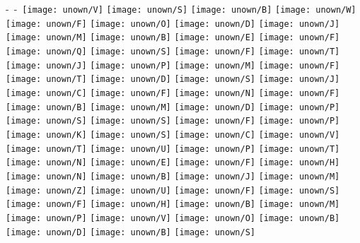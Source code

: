 
\hfill
\vfill

{\noindent -\ -\ 
\texttt{[image: unown/V]}
\texttt{[image: unown/S]}
\texttt{[image: unown/B]}
\texttt{[image: unown/W]}
\texttt{[image: unown/F]}
\texttt{[image: unown/O]}
\texttt{[image: unown/D]}
\texttt{[image: unown/J]}
\texttt{[image: unown/M]}
\texttt{[image: unown/B]}
\texttt{[image: unown/E]}
\texttt{[image: unown/F]}
\texttt{[image: unown/Q]}
\texttt{[image: unown/S]}
\texttt{[image: unown/F]}
\texttt{[image: unown/T]}
\texttt{[image: unown/J]}
\texttt{[image: unown/P]}
\texttt{[image: unown/M]}
\texttt{[image: unown/F]}
\texttt{[image: unown/T]}
\texttt{[image: unown/D]}
\texttt{[image: unown/S]}
\texttt{[image: unown/J]}
\texttt{[image: unown/C]}
\texttt{[image: unown/F]}
\texttt{[image: unown/N]}
\texttt{[image: unown/F]}
\texttt{[image: unown/B]}
\texttt{[image: unown/M]}
\texttt{[image: unown/D]}
\texttt{[image: unown/P]}
\texttt{[image: unown/S]}
\texttt{[image: unown/S]}
\texttt{[image: unown/F]}
\texttt{[image: unown/P]}
\texttt{[image: unown/K]}
\texttt{[image: unown/S]}
\texttt{[image: unown/C]}
\texttt{[image: unown/V]}
\texttt{[image: unown/T]}
\texttt{[image: unown/U]}
\texttt{[image: unown/P]}
\texttt{[image: unown/T]}
\texttt{[image: unown/N]}
\texttt{[image: unown/E]}
\texttt{[image: unown/F]}
\texttt{[image: unown/H]}
\texttt{[image: unown/N]}
\texttt{[image: unown/B]}
\texttt{[image: unown/J]}
\texttt{[image: unown/M]}
\texttt{[image: unown/Z]}
\texttt{[image: unown/U]}
\texttt{[image: unown/F]}
\texttt{[image: unown/S]}
\texttt{[image: unown/F]}
\texttt{[image: unown/H]}
\texttt{[image: unown/B]}
\texttt{[image: unown/M]}
\texttt{[image: unown/P]}
\texttt{[image: unown/V]}
\texttt{[image: unown/O]}
\texttt{[image: unown/B]}
\texttt{[image: unown/D]}
\texttt{[image: unown/B]}
\texttt{[image: unown/S]}
}
